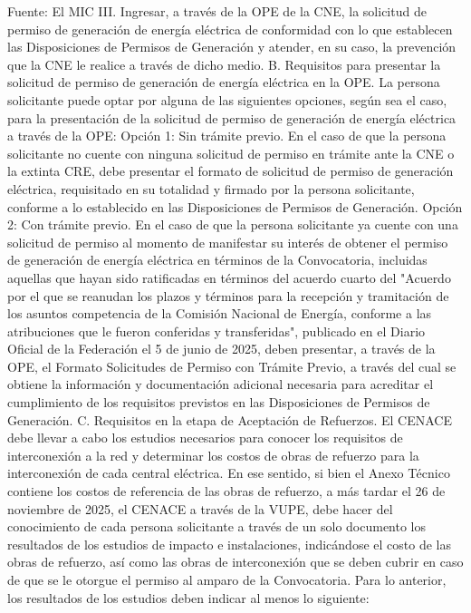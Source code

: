 Fuente: El MIC
III.	Ingresar, a través de la OPE de la CNE, la solicitud de permiso de generación de energía eléctrica de conformidad con lo que establecen las Disposiciones de Permisos de Generación y atender, en su caso, la prevención que la CNE le realice a través de dicho medio.
B. Requisitos para presentar la solicitud de permiso de generación de energía eléctrica en la OPE.
La persona solicitante puede optar por alguna de las siguientes opciones, según sea el caso, para la presentación de la solicitud de permiso de generación de energía eléctrica a través de la OPE:
Opción 1: Sin trámite previo.
En el caso de que la persona solicitante no cuente con ninguna solicitud de permiso en trámite ante la CNE o la extinta CRE, debe presentar el formato de solicitud de permiso de generación eléctrica, requisitado en su totalidad y firmado por la persona solicitante, conforme a lo establecido en las Disposiciones de Permisos de Generación.
Opción 2: Con trámite previo.
En el caso de que la persona solicitante ya cuente con una solicitud de permiso al momento de manifestar su interés de obtener el permiso de generación de energía eléctrica en términos de la Convocatoria, incluidas aquellas que hayan sido ratificadas en términos del acuerdo cuarto del "Acuerdo por el que se reanudan los plazos y términos para la recepción y tramitación de los asuntos competencia de la Comisión Nacional de Energía, conforme a las atribuciones que le fueron conferidas y transferidas", publicado en el Diario Oficial de la Federación el 5 de junio de 2025, deben presentar, a través de la OPE, el Formato Solicitudes de Permiso con Trámite Previo, a través del cual se obtiene la información y documentación adicional necesaria para acreditar el cumplimiento de los requisitos previstos en las Disposiciones de Permisos de Generación.
C. Requisitos en la etapa de Aceptación de Refuerzos.
El CENACE debe llevar a cabo los estudios necesarios para conocer los requisitos de interconexión a la red y determinar los costos de obras de refuerzo para la interconexión de cada central eléctrica.
En ese sentido, si bien el Anexo Técnico contiene los costos de referencia de las obras de refuerzo, a más tardar el 26 de noviembre de 2025, el CENACE a través de la VUPE, debe hacer del conocimiento de cada persona solicitante a través de un solo documento los resultados de los estudios de impacto e instalaciones, indicándose el costo de las obras de refuerzo, así como las obras de interconexión que se deben cubrir en caso de que se le otorgue el permiso al amparo de la Convocatoria. Para lo anterior, los resultados de los estudios deben indicar al menos lo siguiente:

